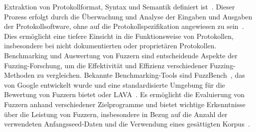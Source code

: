 Extraktion von Protokollformat, Syntax und Semantik definiert ist~\cite{cnn}.
Dieser Prozess erfolgt durch die Überwachung und Analyse der Eingaben und Ausgaben der Protokollsoftware, ohne auf die
Protokollspezifikation angewiesen zu sein~\cite{a-survey-of-network-protocol-fuzzing}.
Dies ermöglicht eine tiefere Einsicht in die Funktionsweise von Protokollen, insbesondere bei nicht dokumentierten oder
proprietären Protokollen.\newline
Benchmarking und Auswertung von Fuzzern sind entscheidende Aspekte der Fuzzing-Forschung, um die Effektivität und Effizienz
verschiedener Fuzzing-Methoden zu vergleichen.
Bekannte Benchmarking-Tools sind FuzzBench~\cite{fuzzbench}, das von Google entwickelt wurde und eine standardisierte Umgebung für die
Bewertung von Fuzzern bietet oder LAVA~\cite{lava}.
Es ermöglicht die Evaluierung von Fuzzern anhand verschiedener Zielprogramme und bietet wichtige Erkenntnisse über die Leistung
von Fuzzern, insbesondere in Bezug auf die Anzahl der verwendeten Anfangsseed-Daten und die Verwendung eines gesättigten Korpus~\cite{fuzzing-evaluation}.